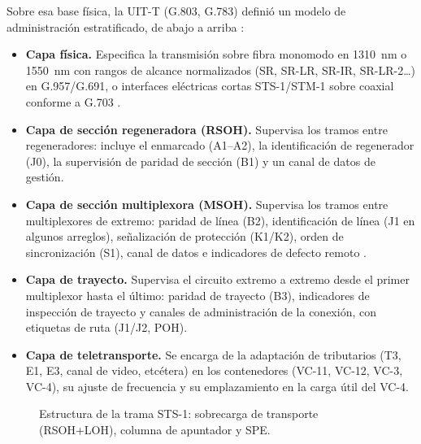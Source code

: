 \documentclass[12pt,a4paper]{article}
\begin{document}
Sobre esa base física, la UIT-T (G.803, G.783) definió un modelo de administración estratificado, de abajo a arriba \cite{ituG803}:

\begin{itemize}
    \item \textbf{Capa física.} Especifica la transmisión sobre fibra monomodo en 1310~nm o 1550~nm con rangos de alcance normalizados (SR, SR-LR, SR-IR, SR-LR-2\dots) en G.957/G.691, o interfaces eléctricas cortas STS-1/STM-1 sobre coaxial conforme a G.703 \cite{itug957}.
    \item \textbf{Capa de sección regeneradora (RSOH).} Supervisa los tramos entre regeneradores: incluye el enmarcado (A1--A2), la identificación de regenerador (J0), la supervisión de paridad de sección (B1) y un canal de datos de gestión.
    \item \textbf{Capa de sección multiplexora (MSOH).} Supervisa los tramos entre multiplexores de extremo: paridad de línea (B2), identificación de línea (J1 en algunos arreglos), señalización de protección (K1/K2), orden de sincronización (S1), canal de datos e indicadores de defecto remoto \cite{itug707, stallings2004}.
    \item \textbf{Capa de trayecto.} Supervisa el circuito extremo a extremo desde el primer multiplexor hasta el último: paridad de trayecto (B3), indicadores de inspección de trayecto y canales de administración de la conexión, con etiquetas de ruta (J1/J2, POH).
    \item \textbf{Capa de teletransporte.} Se encarga de la adaptación de tributarios (T3, E1, E3, canal de video, etcétera) en los contenedores (VC-11, VC-12, VC-3, VC-4), su ajuste de frecuencia y su emplazamiento en la carga útil del VC-4.
\end{itemize}

\begin{figure}[h]
    \centering
    \caption{Estructura de la trama STS-1: sobrecarga de transporte (RSOH+LOH), columna de apuntador y SPE.}
    \label{fig:trama}
\end{figure}
\end{document}
